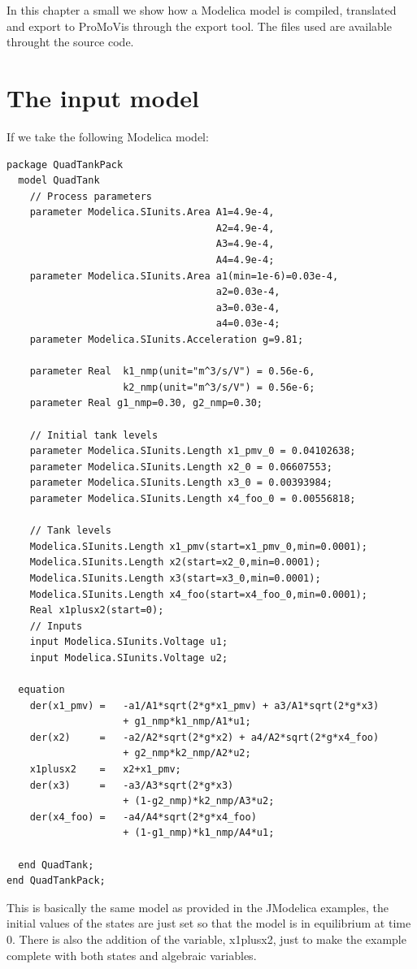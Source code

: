 In this chapter a small we show how a Modelica model is compiled, translated and export to ProMoVis through the export tool. The files used are available throught the source code\cite{githabb}\nocite{*}.

\section{The input model}

If we take the following Modelica model: 
\lstset{language=modelica}
\begin{lstlisting}
package QuadTankPack
  model QuadTank
    // Process parameters
	parameter Modelica.SIunits.Area A1=4.9e-4, 
									A2=4.9e-4, 
									A3=4.9e-4, 
									A4=4.9e-4;
	parameter Modelica.SIunits.Area a1(min=1e-6)=0.03e-4, 
									a2=0.03e-4, 
									a3=0.03e-4, 
									a4=0.03e-4;
	parameter Modelica.SIunits.Acceleration g=9.81;
	
	parameter Real 	k1_nmp(unit="m^3/s/V") = 0.56e-6, 
					k2_nmp(unit="m^3/s/V") = 0.56e-6;
	parameter Real g1_nmp=0.30, g2_nmp=0.30;

    // Initial tank levels
	parameter Modelica.SIunits.Length x1_pmv_0 = 0.04102638;
	parameter Modelica.SIunits.Length x2_0 = 0.06607553;
	parameter Modelica.SIunits.Length x3_0 = 0.00393984;
	parameter Modelica.SIunits.Length x4_foo_0 = 0.00556818;
	
    // Tank levels
	Modelica.SIunits.Length x1_pmv(start=x1_pmv_0,min=0.0001);
	Modelica.SIunits.Length x2(start=x2_0,min=0.0001);
	Modelica.SIunits.Length x3(start=x3_0,min=0.0001);
	Modelica.SIunits.Length x4_foo(start=x4_foo_0,min=0.0001);
	Real x1plusx2(start=0);
	// Inputs
	input Modelica.SIunits.Voltage u1;
	input Modelica.SIunits.Voltage u2;

  equation    
    der(x1_pmv) = 	-a1/A1*sqrt(2*g*x1_pmv) + a3/A1*sqrt(2*g*x3) 
					+ g1_nmp*k1_nmp/A1*u1;						
	der(x2) 	= 	-a2/A2*sqrt(2*g*x2) + a4/A2*sqrt(2*g*x4_foo)
					+ g2_nmp*k2_nmp/A2*u2;
	x1plusx2	=	x2+x1_pmv;
	der(x3) 	= 	-a3/A3*sqrt(2*g*x3) 
					+ (1-g2_nmp)*k2_nmp/A3*u2;
	der(x4_foo) = 	-a4/A4*sqrt(2*g*x4_foo) 
					+ (1-g1_nmp)*k1_nmp/A4*u1;

  end QuadTank;
end QuadTankPack;
\end{lstlisting}
This is basically the same model as provided in the JModelica examples, the initial values of the states are just set so that the model is in equilibrium at time 0. There is also the addition of the variable, x1plusx2, just to make the example complete with both states and algebraic variables. 
